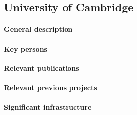 \subsection{University of Cambridge}
\label{sec:ucam}

\paragraph{General description}

\paragraph{Key persons}

\paragraph{Relevant publications}

\paragraph{Relevant previous projects}

\paragraph{Significant infrastructure}